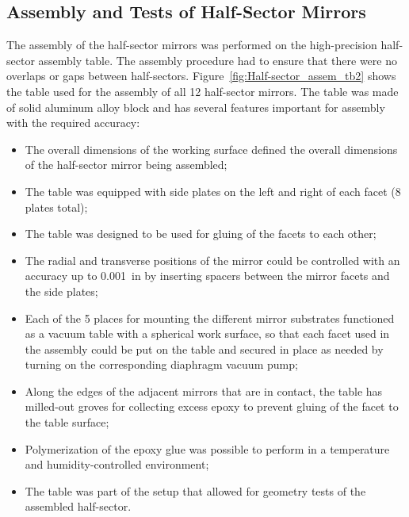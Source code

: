 \subsection{Assembly and Tests of Half-Sector Mirrors}

The assembly of the half-sector mirrors was performed on the high-precision half-sector assembly table. The
assembly procedure had to ensure that there were no overlaps or gaps between half-sectors.
Figure~\ref{fig:Half-sector_assem_tb2} shows the table used for the assembly of all 12 half-sector mirrors.
The table was made of solid aluminum alloy block and has several features important for assembly with the
required accuracy:
\begin{itemize}
\item The overall dimensions of the working surface defined the overall dimensions of the half-sector mirror
  being assembled;
    \item The table was equipped with side plates on the left and right of each facet (8 plates total);
    \item The table was designed to be used for gluing of the facets to each other;
    \item The radial and transverse positions of the mirror could be controlled with an accuracy up to 0.001~in by
      inserting spacers between the mirror facets and the side plates;
    \item Each of the 5 places for mounting the different mirror substrates functioned as a vacuum table with a
      spherical work surface, so that each  facet used in the assembly could  be put on the table and secured in place
      as needed by turning on the corresponding diaphragm vacuum pump;
    \item Along the edges of the adjacent mirrors that are in contact, the table has milled-out groves for collecting
      excess epoxy to prevent gluing of the facet to the table surface;
    \item Polymerization of the epoxy glue was possible to perform in a temperature and humidity-controlled
      environment;
    \item The table was part of the setup that allowed for geometry tests of the assembled half-sector.
\end{itemize}

